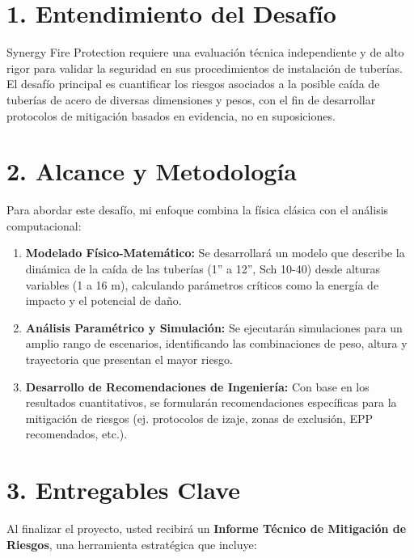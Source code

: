 \documentclass[a4paper,12pt]{article}
\begin{document}

\section*{1. Entendimiento del Desafío}

Synergy Fire Protection requiere una evaluación técnica independiente y de alto rigor para validar la seguridad en sus procedimientos de instalación de tuberías. El desafío principal es cuantificar los riesgos asociados a la posible caída de tuberías de acero de diversas dimensiones y pesos, con el fin de desarrollar protocolos de mitigación basados en evidencia, no en suposiciones.

\section*{2. Alcance y Metodología}

Para abordar este desafío, mi enfoque combina la física clásica con el análisis computacional:

\begin{enumerate}[leftmargin=*, label=\textbf{Fase \arabic*:}]
    \item \textbf{Modelado Físico-Matemático:} Se desarrollará un modelo que describe la dinámica de la caída de las tuberías (1'' a 12'', Sch 10-40) desde alturas variables (1 a 16 m), calculando parámetros críticos como la energía de impacto y el potencial de daño.
    \item \textbf{Análisis Paramétrico y Simulación:} Se ejecutarán simulaciones para un amplio rango de escenarios, identificando las combinaciones de peso, altura y trayectoria que presentan el mayor riesgo.
    \item \textbf{Desarrollo de Recomendaciones de Ingeniería:} Con base en los resultados cuantitativos, se formularán recomendaciones específicas para la mitigación de riesgos (ej. protocolos de izaje, zonas de exclusión, EPP recomendados, etc.).
\end{enumerate}

\section*{3. Entregables Clave}

Al finalizar el proyecto, usted recibirá un \textbf{Informe Técnico de Mitigación de Riesgos}, una herramienta estratégica que incluye:
\end{document}
